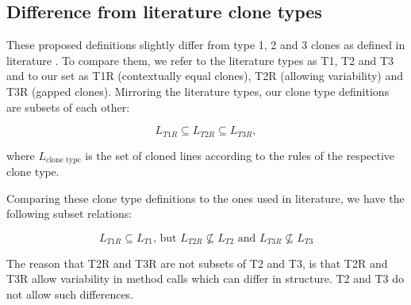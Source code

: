 \documentclass[sigconf,review,anonymous]{acmart}
\begin{document}
\subsection{Difference from literature clone types}\label{sec:different-types}
These proposed definitions slightly differ from type 1, 2 and 3 clones as defined in literature \cite{roy2007survey}. To compare them, we refer to the literature types as T1, T2 and T3 and to our set as T1R (contextually equal clones), T2R (allowing variability) and T3R (gapped clones). Mirroring the literature types, our clone type definitions are subsets of each other:

\begin{equation}\label{eq:typerelation}
L_{T1R} \subseteq L_{T2R} \subseteq L_{T3R},
\end{equation}

where $L_{\text{clone type}}$ is the set of cloned lines according to the rules of the respective $\text{clone type}$.

Comparing these clone type definitions to the ones used in literature, we have the following subset relations:

\begin{equation}\label{eq:typerelation2}
L_{T1R} \subseteq L_{T1} \text{, but } L_{T2R} \nsubseteq L_{T2} \text{ and } L_{T3R} \nsubseteq L_{T3}
\end{equation}

The reason that T2R and T3R are not subsets of T2 and T3, is that T2R and T3R allow variability in method calls which can differ in structure. T2 and T3 do not allow such differences.
\end{document}
